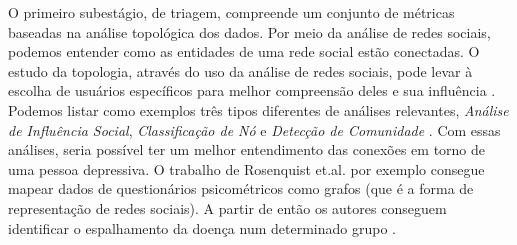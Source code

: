 \documentclass[11pt, notitlepage]{article} %
\begin{document}
O primeiro subestágio, de triagem, compreende um conjunto de métricas baseadas na análise topológica dos dados. Por meio da análise de redes sociais, podemos entender como as entidades de uma rede social estão conectadas. O estudo da topologia, através do uso da análise de redes sociais, pode levar à escolha de usuários específicos para melhor compreensão deles e sua influência \cite{Razis2020}. Podemos listar como exemplos três tipos diferentes de análises relevantes, \textit{Análise de Influência Social}, \textit{Classificação de Nó} e \textit{Detecção de Comunidade} \cite{aggarwal2011socialnetwork}. Com essas análises, seria possível ter um melhor entendimento das conexões em torno de uma pessoa depressiva. O trabalho de Rosenquist et.al. por exemplo consegue mapear dados de questionários psicométricos como grafos (que é a forma de representação de redes sociais). A partir de então os autores conseguem identificar o espalhamento da doença num determinado grupo \cite{Rosenquist2011}.
\end{document}
